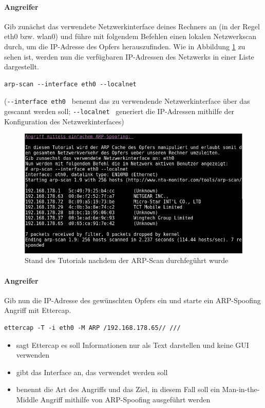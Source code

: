 \paragraph{Angreifer} Gib zunächst das verwendete Netzwerkinterface deines Rechners an (in der Regel eth0 bzw. wlan0) und führe mit folgendem Befehlen einen lokalen Netzwerkscan durch, um die IP-Adresse des Opfers herauszufinden. Wie in Abbildung \ref{fig:arpscan} zu sehen ist, werden nun die verfügbaren IP-Adressen des Netzwerks in einer Liste dargestellt.
\begin{lstlisting}
arp-scan --interface eth0 --localnet
\end{lstlisting}
(\colorbox{altgray}{\lstinline|--interface eth0 |} benennt das zu verwendende Netzwerkinterface über das gescannt werden soll; \colorbox{altgray}{\lstinline|--localnet |} generiert die IP-Adressen mithilfe der Konfiguration des Netzwerkinterfaces)

\begin{figure}
	\centering
	\includegraphics[width=\textwidth]{images/ARP_Spoofing/arp_scan}
	\caption{Stand des Tutorials nachdem der ARP-Scan durchfegührt wurde}
	\label{fig:arpscan}
\end{figure}

\paragraph{Angreifer} Gib nun die IP-Adresse des gewünschten Opfers ein und starte ein ARP-Spoofing Angriff mit Ettercap.
\begin{lstlisting}
ettercap -T -i eth0 -M ARP /192.168.178.65// ///
\end{lstlisting}

\begin{itemize}
	\item {} sagt Ettercap es soll Informationen nur als Text darstellen und keine GUI verwenden
	\item {} gibt das Interface an, das verwendet werden soll
	\item {} benennt die Art des Angriffs und das Ziel, in diesem Fall soll ein Man-in-the-Middle Angriff mithilfe von ARP-Spoofing ausgeführt werden
\end{itemize}


